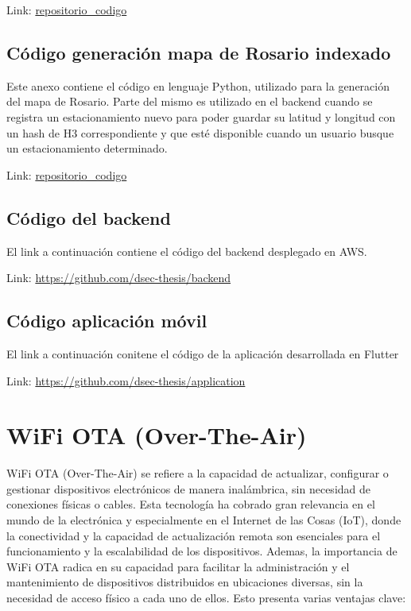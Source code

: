 \begin{appendixd}
            Link: \url{repositorio_codigo}


        \subsection{Código generación mapa de Rosario indexado}
            Este anexo contiene el código en lenguaje Python, utilizado para la generación del mapa de Rosario. 
            Parte del mismo es utilizado en el backend cuando se registra un estacionamiento nuevo para poder guardar su latitud y 
            longitud con un hash de H3 correspondiente y que esté disponible cuando un usuario busque un estacionamiento determinado.

            Link: \url{repositorio_codigo}

        \subsection{Código del backend}
            El link a continuación contiene el código del backend desplegado en AWS.

            Link: \url{https://github.com/dsec-thesis/backend}

        \subsection{Código aplicación móvil}
            El link a continuación conitene el código de la aplicación desarrollada en Flutter

            Link: \url{https://github.com/dsec-thesis/application}
    \clearpage
    \section{WiFi OTA (Over-The-Air)}{\label{configuracion_wifi}}
        WiFi OTA (Over-The-Air) se refiere a la capacidad de actualizar, configurar o gestionar dispositivos electrónicos de manera inalámbrica, 
        sin necesidad de conexiones físicas o cables. Esta tecnología ha cobrado gran relevancia en el mundo de la electrónica y 
        especialmente en el Internet de las Cosas (IoT), donde la conectividad y la capacidad de actualización remota son 
        esenciales para el funcionamiento y la escalabilidad de los dispositivos. Ademas, la importancia de WiFi OTA radica 
        en su capacidad para facilitar la administración y el mantenimiento de dispositivos distribuidos en ubicaciones diversas,
        sin la necesidad de acceso físico a cada uno de ellos. Esto presenta varias ventajas clave:


\end{appendixd}
